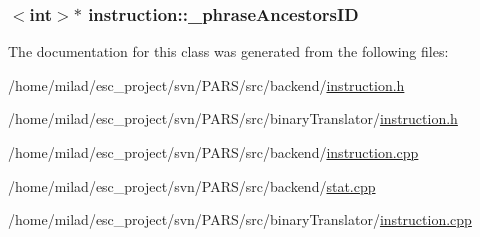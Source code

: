 \label{classinstruction_a728468d228311067d26e390b263dc140}
\hypertarget{classinstruction_a2631d0b5947d06f6ff13170e6dc88f78}{
\subsubsection[{\_\-phraseAncestorsID}]{$<$int$>$$\ast$ {\bf instruction::\_\-phraseAncestorsID}}}
\label{classinstruction_a2631d0b5947d06f6ff13170e6dc88f78}


The documentation for this class was generated from the following files:\begin{DoxyCompactItemize}
\item 
/home/milad/esc\_\-project/svn/PARS/src/backend/\hyperlink{backend_2instruction_8h}{instruction.h}\item 
/home/milad/esc\_\-project/svn/PARS/src/binaryTranslator/\hyperlink{binaryTranslator_2instruction_8h}{instruction.h}\item 
/home/milad/esc\_\-project/svn/PARS/src/backend/\hyperlink{backend_2instruction_8cpp}{instruction.cpp}\item 
/home/milad/esc\_\-project/svn/PARS/src/backend/\hyperlink{backend_2stat_8cpp}{stat.cpp}\item 
/home/milad/esc\_\-project/svn/PARS/src/binaryTranslator/\hyperlink{binaryTranslator_2instruction_8cpp}{instruction.cpp}\end{DoxyCompactItemize}
